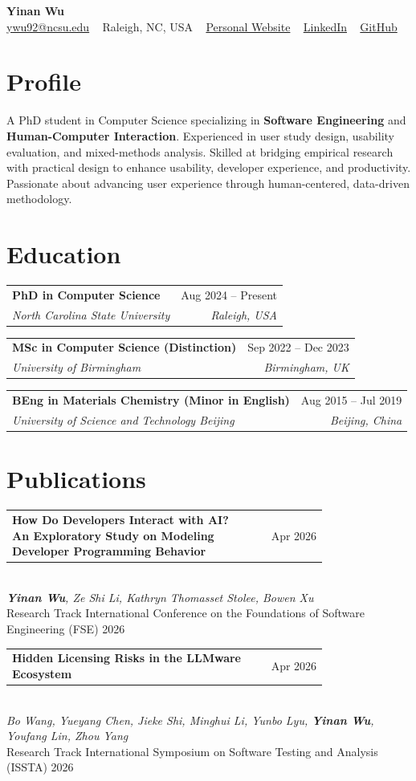 \documentclass[11pt,a4paper]{article}
\makeatletter
\newcommand{\entry}[4]{%
  \noindent\begin{minipage}[t]{\linewidth}
    \begin{tabular*}{\linewidth}{@{}l@{\extracolsep{\fill}}r@{}}
      \textbf{#1} & #3 \\
      \textit{\color{muted}#2} & \textit{\color{muted}#4} \\
    \end{tabular*}
  \end{minipage}\vspace{2pt}
}
\newcommand{\pub}[4]{%
  \noindent\begin{tabular*}{\linewidth}{@{}p{0.78\linewidth}@{\extracolsep{\fill}}r@{}}
    \small\textbf{#1} & \small #4 \\
  \end{tabular*}\\
  \small\textit{#2}\\
  {\small\color{muted}#3}
  \vspace{6pt}
}
\newcommand{\me}{\textnormal{\textbf{Yinan Wu}}}
\makeatother
\begin{document}
\begin{center}
  {\LARGE\bfseries Yinan Wu}\\[6pt]
  {\color{muted}\small
    \href{mailto:ywu92@ncsu.edu}{ywu92@ncsu.edu}
    \,\textbar\,\, Raleigh, NC, USA
    \,\textbar\,\, \href{https://yinanwusoymilk.github.io/}{Personal Website}
    \,\textbar\,\, \href{https://www.linkedin.com/in/yinan-wu-99a214262/}{LinkedIn}
    \,\textbar\,\, \href{https://github.com/YinanWusoymilk}{GitHub}
  }
\end{center}
\vspace{4pt}

\section*{Profile}
A PhD student in Computer Science specializing in \textbf{Software Engineering} and \textbf{Human-Computer Interaction}. Experienced in user study design, usability evaluation, and mixed-methods analysis. Skilled at bridging empirical research with practical design to enhance usability, developer experience, and productivity. Passionate about advancing user experience through human-centered, data-driven methodology.

\section*{Education}
\entry{PhD in Computer Science}{North Carolina State University}{Aug 2024 -- Present}{Raleigh, USA}
\entry{MSc in Computer Science \textnormal{(Distinction)}}{University of Birmingham}{Sep 2022 -- Dec 2023}{Birmingham, UK}
\entry{BEng in Materials Chemistry \textnormal{(Minor in English)}}{University of Science and Technology Beijing}{Aug 2015 -- Jul 2019}{Beijing, China}

\section*{Publications}

\pub{How Do Developers Interact with AI? An Exploratory Study on Modeling Developer Programming Behavior}%
{\me, Ze Shi Li, Kathryn Thomasset Stolee, Bowen Xu}%
{Research Track \textbar{} International Conference on the Foundations of Software Engineering (FSE) 2026}%
{Apr 2026}

\pub{Hidden Licensing Risks in the LLMware Ecosystem}%
{Bo Wang, Yueyang Chen, Jieke Shi, Minghui Li, Yunbo Lyu, \me, Youfang Lin, Zhou Yang}%
{Research Track \textbar{} International Symposium on Software Testing and Analysis (ISSTA) 2026}%
{Apr 2026}
\end{document}
